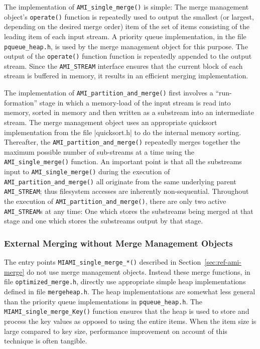 The implementation of  \verb|AMI_single_merge()| is simple: The merge management
object's \verb|operate()| function
is repeatedly used to output the smallest (or largest, depending on the desired
merge order) item of the set of items consisting of the leading item of each input 
stream. A priority queue implementation, in the file \verb|pqueue_heap.h|, is
used by the merge management object for this purpose. The output of the  \verb|operate()| 
function function is repeatedly appended to the output stream. Since the \verb|AMI_STREAM| interface ensures that the current block of each stream is buffered in memory, it results 
in an efficient merging implementation.

The implementation of  \verb|AMI_partition_and_merge()| first involves 
a ``run-formation'' stage in which a memory-load of the input stream is 
read into memory, sorted in memory and then written as a substream into
an intermediate stream. The merge management object uses an appropriate 
quicksort implementation from the file \veb|quicksort.h| to do the internal
memory sorting. Thereafter, the \verb|AMI_partition_and_merge()| repeatedly
merges together the maximum possible number of sub-streams at a time using the 
\verb|AMI_single_merge()| function. An important point is that all the
substreams input to \verb|AMI_single_merge()| during the execution of 
\verb|AMI_partition_and_merge()| all originate from the same underlying
parent \verb|AMI_STREAM|; thus filesystem accesses are inherently non-sequential.
Throughout the execution of \verb|AMI_partition_and_merge()|, there are only
two active \verb|AMI_STREAM|s at any time: One which stores the substreams
being merged at that stage and one which stores the substreams output by
that stage.

\subsubsection{External Merging without Merge Management Objects}
The entry points \verb|MIAMI_single_merge_*()| described in Section~\ref{sec:ref-ami-merge} 
do not use merge management objects. Instead  these merge functions, in file
\verb|optimized_merge.h|,  directly use appropriate simple heap implementations 
defined in file \verb|mergeheap.h|. The heap implementations are somewhat less general
than the priority queue implementations in \verb|pqueue_heap.h|. The 
\verb|MIAMI_single_merge_Key()| function ensures that the heap is used to
store and process the key values as opposed to using the entire items. When
the item size is large compared to key size, performance improvement on account
of this technique is often tangible.

